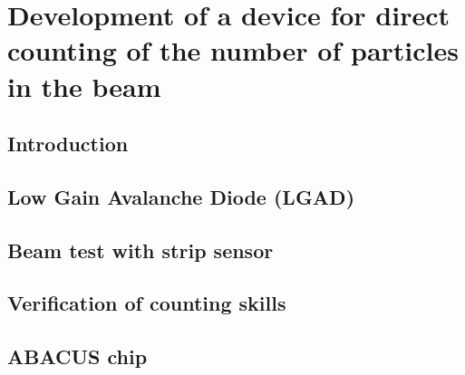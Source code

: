 \chapter{Development of a device for direct counting of the number of particles in the beam}

\section{Introduction}

\section{Low Gain Avalanche Diode (LGAD)}

\section{Beam test with strip sensor}

\section{Verification of counting skills}

\section{ABACUS chip}
